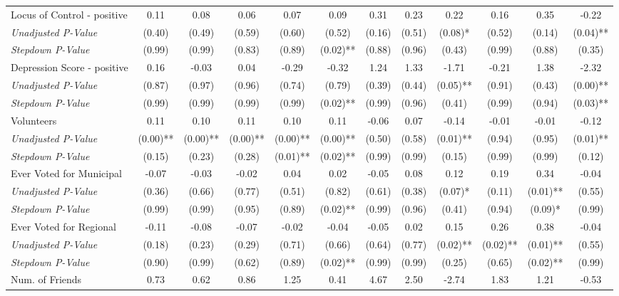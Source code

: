 \begin{tabular}{l c c c c c c c c c c c}
Locus of Control - positive & 0.11 & 0.08 & 0.06 & 0.07 & 0.09 & 0.31 & 0.23 & 0.22 & 0.16 & 0.35 & -0.22 \\
\quad \textit{Unadjusted P-Value} & (0.40) & (0.49) & (0.59) & (0.60) & (0.52) & (0.16) & (0.51) & (0.08)* & (0.52) & (0.14) & (0.04)** \\
\quad \textit{Stepdown P-Value} & (0.99) & (0.99) & (0.83) & (0.89) & (0.02)** & (0.88) & (0.96) & (0.43) & (0.99) & (0.88) & (0.35) \\
Depression Score - positive & 0.16 & -0.03 & 0.04 & -0.29 & -0.32 & 1.24 & 1.33 & -1.71 & -0.21 & 1.38 & -2.32 \\
\quad \textit{Unadjusted P-Value} & (0.87) & (0.97) & (0.96) & (0.74) & (0.79) & (0.39) & (0.44) & (0.05)** & (0.91) & (0.43) & (0.00)** \\
\quad \textit{Stepdown P-Value} & (0.99) & (0.99) & (0.99) & (0.99) & (0.02)** & (0.99) & (0.96) & (0.41) & (0.99) & (0.94) & (0.03)** \\
Volunteers & 0.11 & 0.10 & 0.11 & 0.10 & 0.11 & -0.06 & 0.07 & -0.14 & -0.01 & -0.01 & -0.12 \\
\quad \textit{Unadjusted P-Value} & (0.00)** & (0.00)** & (0.00)** & (0.00)** & (0.00)** & (0.50) & (0.58) & (0.01)** & (0.94) & (0.95) & (0.01)** \\
\quad \textit{Stepdown P-Value} & (0.15) & (0.23) & (0.28) & (0.01)** & (0.02)** & (0.99) & (0.99) & (0.15) & (0.99) & (0.99) & (0.12) \\
Ever Voted for Municipal & -0.07 & -0.03 & -0.02 & 0.04 & 0.02 & -0.05 & 0.08 & 0.12 & 0.19 & 0.34 & -0.04 \\
\quad \textit{Unadjusted P-Value} & (0.36) & (0.66) & (0.77) & (0.51) & (0.82) & (0.61) & (0.38) & (0.07)* & (0.11) & (0.01)** & (0.55) \\
\quad \textit{Stepdown P-Value} & (0.99) & (0.99) & (0.95) & (0.89) & (0.02)** & (0.99) & (0.96) & (0.41) & (0.94) & (0.09)* & (0.99) \\
Ever Voted for Regional & -0.11 & -0.08 & -0.07 & -0.02 & -0.04 & -0.05 & 0.02 & 0.15 & 0.26 & 0.38 & -0.04 \\
\quad \textit{Unadjusted P-Value} & (0.18) & (0.23) & (0.29) & (0.71) & (0.66) & (0.64) & (0.77) & (0.02)** & (0.02)** & (0.01)** & (0.55) \\
\quad \textit{Stepdown P-Value} & (0.90) & (0.99) & (0.62) & (0.89) & (0.02)** & (0.99) & (0.99) & (0.25) & (0.65) & (0.02)** & (0.99) \\
Num. of Friends & 0.73 & 0.62 & 0.86 & 1.25 & 0.41 & 4.67 & 2.50 & -2.74 & 1.83 & 1.21 & -0.53 \\

\end{tabular}
